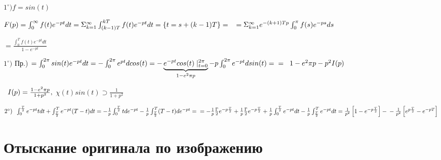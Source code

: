 \vspace{0.5cm}
$1^{\circ}) f = sin(t) $ 

\vspace{0.5cm}
{\Large $F(p) = \int_0^\infty f(t)e^{-pt}dt = \Sigma_{k=1}^\infty \int_{(k-1)T}^{kT} f(t)e^{-pt} dt = \lbrace t = s + (k-1)T\rbrace = \\ \text{\hspace{0.2cm}} = \Sigma_{k=1}^\infty e^{-(k+1)Tp} \int_0^\pi f(s) e^{-ps} ds$}
\begin{LARGE}
$ = \frac{\int_0^T f(t)e^{-pt}dt}{1 - e^{-pt}}$
\end{LARGE}

\vspace{0.5cm}
\begin{large}
$1^{\circ})$ Пр.) $ = \int_0^{2\pi} sin(t) e^{-pt} dt = - \int_0^{2\pi} e^{pt} d cos(t) = -\underbrace{e^{-pt}cos(t)\mid_{t=0}^{2\pi} }_{1-e^2\pi p} - p\int_0^{2\pi}e^{-pt} d sin(t)  
=\\ =\text{\hspace{0.2cm}} 1-e^2\pi p - p^2 I(p)$
\end{large}

\vspace{0.5cm}
\begin{Large}
$
\text{\hspace{0.2cm}} I(p) = \frac{1-e^2\pi p}{1+p^2},
$
\hspace{0.8cm}
$
\chi(t)sin(t)\supset \frac{1}{1+p^2}
$

\end{Large}

\vspace{0.5cm}
\begin{Large}
$2^{\circ}) \text{\hspace{0.2cm}} \int_0^{\frac{T}{2}}e^{-pt}tdt + \int_{\frac{T}{2}}^T e^{-pt}(T -t)dt = 
-\frac{1}{p}\int_0^{\frac{T}{2}} t de^{-pt} -\frac{1}{p} \int_{\frac{T}{2}}^T (T - t) de^{-pt} = \\ =
-\frac{1}{p}\frac{\Gamma}{2}e^{-p\frac{T}{2}} + \frac{1}{p}\frac{\Gamma}{2}e^{-p\frac{T}{2}} + \frac{1}{p}\int_0^{\frac{T}{2}} e^{-pt} dt - \frac{1}{p}\int_{\frac{T}{2}}^T e^{-pt}dt =
\frac{1}{p^2}\left[1-e^{-p\frac{T}{2}}\right] - \\ - \frac{1}{p^2}\left[e^{p\frac{T}{2}} - e^{-pT}\right]
$
\end{Large}

\section{Отыскание оригинала по изображению}


